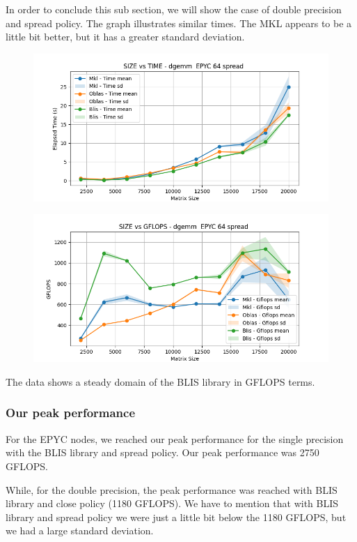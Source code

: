 \documentclass{article}
\begin{document}
In order to conclude this sub section, we will show the case of double precision and spread policy. 
The graph illustrates similar times. The MKL appears to be a little bit better, but it has a greater standard deviation. 
\begin{figure}[H]
    \centering
    \includegraphics[width=\textwidth]{EPYC 64/dgemm__EPYC_64_spread_time.png}
\end{figure}

\begin{figure}[H]
    \centering
    \includegraphics[width=\textwidth]{EPYC 64/dgemm__EPYC_64_spread_gflops.png}
\end{figure}

The data shows a steady domain of the BLIS library in GFLOPS terms. 

\subsubsection{Our peak performance}
For the EPYC nodes, we reached our peak performance for the single precision with the BLIS library and spread policy. Our peak performance was 2750 GFLOPS.

While, for the double precision, the peak performance was reached with BLIS library and close policy (1180 GFLOPS). We have to mention that with BLIS library and spread policy we were just a little bit below the 1180 GFLOPS, but we had a large standard deviation.
\end{document}
